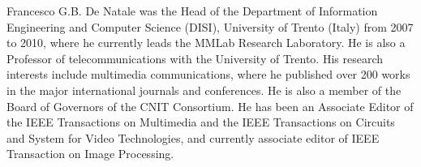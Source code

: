 \documentclass{ieeeaccess}
\begin{document}
\begin{IEEEbiography}{Francesco G.B. De Natale} was the Head of the Department of Information Engineering and Computer Science (DISI), University of Trento (Italy) from 2007 to 2010, where he currently leads the MMLab Research Laboratory. He is also a Professor of telecommunications with the University of Trento. His research interests include multimedia communications, where he published over 200 works in the major international journals and conferences. He is also a member of the Board of Governors of the CNIT Consortium. He has been an Associate Editor of the IEEE Transactions on Multimedia and the IEEE Transactions on Circuits and System for Video Technologies, and currently associate editor of IEEE Transaction on Image Processing.
\end{IEEEbiography}
\EOD
\end{document}
